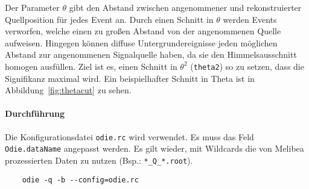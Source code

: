 Der Parameter $\theta$ gibt den Abstand zwischen
angenommener und rekonstruierter Quellposition
für jedes Event an.
Durch einen Schnitt in $\theta$ werden Events verworfen,
welche einen zu großen Abstand von der angenommenen Quelle aufweisen.
Hingegen können diffuse Untergrundereignisse jeden möglichen Abstand zur
angenommenen Signalquelle haben,
da sie den Himmelsausschnitt homogen ausfüllen.
Ziel ist es, einen Schnitt in $\theta^2$ (\texttt{theta2}) so zu setzen,
dass die Signifikanz maximal wird.
Ein beispielhafter Schnitt in Theta ist in
Abbildung~\ref{fig:thetacut} zu sehen.


\paragraph{Durchführung}%

Die Konfigurations\-datei \texttt{odie.rc} wird verwendet.
Es muss das Feld \texttt{Odie.dataName} angepasst werden.
Es gilt wieder, mit Wildcards die von Melibea prozessierten Daten zu nutzen
(Bsp.: \texttt{*\_Q\_*.root}).

\begin{lstlisting}
	odie -q -b --config=odie.rc
\end{lstlisting}
